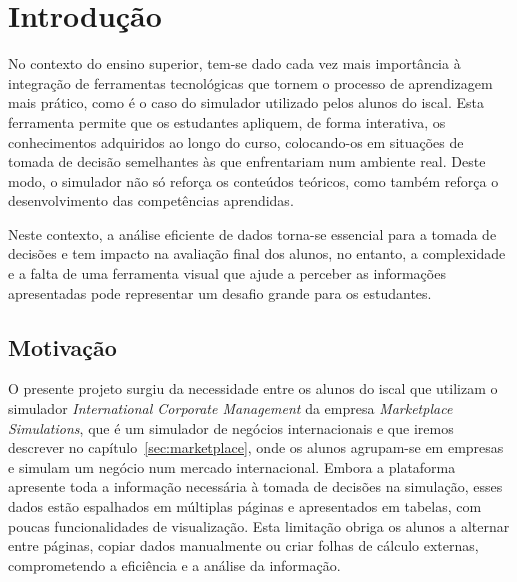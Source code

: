 

\chapter{Introdução}
\label{ch:introducao}

No contexto do ensino superior, tem-se dado cada vez mais importância à integração de ferramentas tecnológicas que tornem o processo de aprendizagem mais prático, como é o caso do simulador utilizado pelos alunos do \gls{iscal}. Esta ferramenta permite que os estudantes apliquem, de forma interativa, os conhecimentos adquiridos ao longo do curso, colocando-os em situações de tomada de decisão semelhantes às que enfrentariam num ambiente real. Deste modo, o simulador não só reforça os conteúdos teóricos, como também reforça o desenvolvimento das competências aprendidas. 

Neste contexto, a análise eficiente de dados torna-se essencial para a tomada de decisões e tem impacto na avaliação final dos alunos, no entanto, a complexidade e a falta de uma ferramenta visual que ajude a perceber as informações apresentadas pode representar um desafio grande para os estudantes.

\section{Motivação}

O presente projeto surgiu da necessidade  entre os alunos do \gls{iscal} que utilizam o simulador \textit{International Corporate Management} da empresa \textit{Marketplace Simulations}, que é um simulador de negócios internacionais e que iremos descrever no capítulo~\ref{sec:marketplace}, onde os alunos agrupam-se em empresas e simulam um negócio num mercado internacional. Embora a plataforma apresente toda a informação necessária à tomada de decisões na simulação, esses dados estão espalhados em múltiplas páginas e apresentados em tabelas, com poucas funcionalidades de visualização. Esta limitação obriga os alunos a alternar entre páginas, copiar dados manualmente ou criar folhas de cálculo externas, comprometendo a eficiência e a análise da informação.


